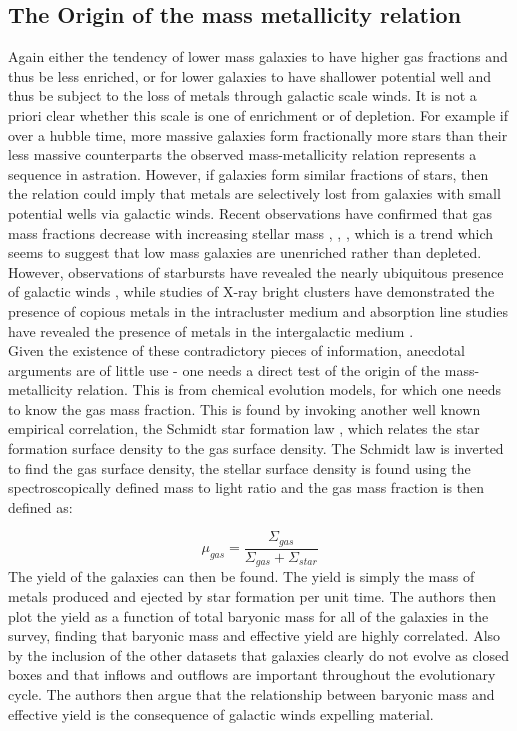 \documentclass{literature}
\begin{document}
\subsection{The Origin of the mass metallicity relation}
Again either the tendency of lower mass galaxies to have higher gas fractions and thus be less enriched, or for lower galaxies to have shallower potential well and thus be subject to the loss of metals through galactic scale winds. It is not a priori clear whether this scale is one of enrichment or of depletion. For example if over a hubble time, more massive galaxies form fractionally more stars than their less massive counterparts the observed mass-metallicity relation represents a sequence in astration. However, if galaxies form similar fractions of stars, then the relation could imply that metals are selectively lost from galaxies with small potential wells via galactic winds. Recent observations have confirmed that gas mass fractions decrease with increasing stellar mass \citep{McGaugh1997}, \citep{Bell2000}, \citep{Boselli2001}, which is a trend which seems to suggest that low mass galaxies are unenriched rather than depleted. However, observations of starbursts have revealed the nearly ubiquitous presence of galactic winds \citep{Heckman2001}, while studies of X-ray bright clusters have demonstrated the presence of copious metals in the intracluster medium \citep{Gibson1997} and absorption line studies have revealed the presence of metals in the intergalactic medium \citep{Ellison2000}. \\ 
Given the existence of these contradictory pieces of information, anecdotal arguments are of little use - one needs a direct test of the origin of the mass-metallicity relation. This is from chemical evolution models, for which one needs to know the gas mass fraction. This is found by invoking another well known empirical correlation, the Schmidt star formation law \citep{Jr1998}, which relates the star formation surface density to the gas surface density. The Schmidt law is inverted to find the gas surface density, the stellar surface density is found using the spectroscopically defined mass to light ratio and the gas mass fraction is then defined as: 

\begin{equation}
	\mu _{gas} = \frac{\Sigma _{gas}}{\Sigma _{gas} + \Sigma _{star}}
\end{equation}
The yield of the galaxies can then be found. The yield is simply the mass of metals produced and ejected by star formation per unit time. The authors then plot the yield as a function of total baryonic mass for all of the galaxies in the survey, finding that baryonic mass and effective yield are highly correlated. Also by the inclusion of the other datasets that galaxies clearly do not evolve as closed boxes and that inflows and outflows are important throughout the evolutionary cycle. The authors then argue that the relationship between baryonic mass and effective yield is the consequence of galactic winds expelling material. 
\end{document}
